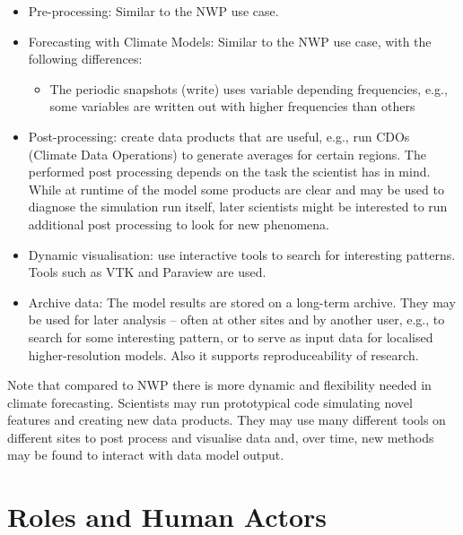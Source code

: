 \begin{itemize}
	\item Pre-processing: Similar to the NWP use case.
	\item Forecasting with Climate Models: Similar to the NWP use case, with the following differences:
	\begin{itemize}
		\item The periodic snapshots (write) uses variable depending frequencies, e.g., some variables are written out with higher frequencies than others
	\end{itemize}
	\item Post-processing: create data products that are useful, e.g., run CDOs (Climate Data Operations) to generate averages for certain regions. The performed post processing depends on the task the scientist has in mind. While at runtime of the model some products are clear and may be used to diagnose the simulation run itself, later scientists might be interested to run additional post processing to look for new phenomena.
	\item Dynamic visualisation: use interactive tools to search for interesting patterns. Tools such as VTK and Paraview are used. %
	\item Archive data: The model results are stored on a long-term archive. They may be used for later analysis --  often at other sites and by another user, e.g., to search for some interesting pattern, or to serve as input data for localised higher-resolution models. Also it supports reproduceability of research.
\end{itemize}

Note that compared to NWP there is more dynamic and flexibility needed in climate forecasting.
Scientists may run prototypical code simulating novel features and creating new data products.
They may use many different tools on different sites to post process and visualise data and, over time, new methods may be found to interact with data model output.

\section{Roles and Human Actors}
\label{sec:use cases/actors}

